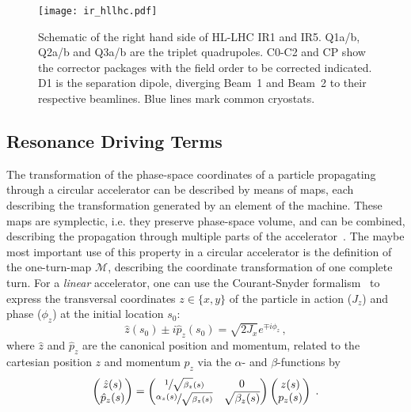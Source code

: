 \begin{figure}[h!]
    \centering
    \texttt{[image: ir\_hllhc.pdf]}
    \caption{Schematic of the right hand side of HL-LHC IR1 and IR5.
    Q1a/b, Q2a/b and Q3a/b are the triplet quadrupoles. 
    C0-C2 and CP show the corrector packages with the field order to be corrected indicated. 
    D1 is the separation dipole, diverging Beam~1 and Beam~2
    to their respective beamlines. 
    Blue lines mark common cryostats. 
    }
    \label{fig:irregionhllhc}
\end{figure}


\subsection{Resonance Driving Terms}

The transformation of the phase-space coordinates of a particle propagating through a circular accelerator 
can be described by means of maps, each describing the transformation generated by an element of the machine.
These maps are symplectic, i.e. they preserve phase-space volume, and can be combined, describing the propagation 
through multiple parts of the accelerator~\cite{DragtLieSeriesInvariant1976}.
The maybe most important use of this property in a circular accelerator is the definition of the one-turn-map $\mathcal{M}$, 
describing the coordinate transformation of one complete turn. 
For a \textit{linear} accelerator, one can use the Courant-Snyder formalism~\cite{CourantTheoryAlternatinggradientSynchrotron1958} 
to express the transversal coordinates $z \in \{x, y\}$
of the particle in action ($J_z$) and phase ($\phi_z$) at the initial location $s_0$:
%
\begin{equation}
    \label{eq:CSInitalCoordinates}
    \hat{z}(s_0) \pm i\hat{p}_z(s_0) = \sqrt{2J_x}e^{\mp i \phi_z} \, ,
\end{equation}
%
where $\hat{z}$ and $\hat{p}_z$ are the canonical position and momentum, 
related to the cartesian position $z$ and momentum $p_z$ via the $\alpha$- and 
$\beta$-functions by 
%
\begin{equation}
    \begin{pmatrix}\hat{z}(s) \\ \hat{p}_z(s) \end{pmatrix} = 
    \begin{pmatrix} \sfrac{1}{\sqrt{\beta_z}(s)} & 0 \\ \sfrac{\alpha_z(s)}{\sqrt{\beta_z(s)}} & \sqrt{\beta_z(s)}\end{pmatrix}
    \begin{pmatrix}z(s) \\ p_z(s)\end{pmatrix}
    \;.
\end{equation}

